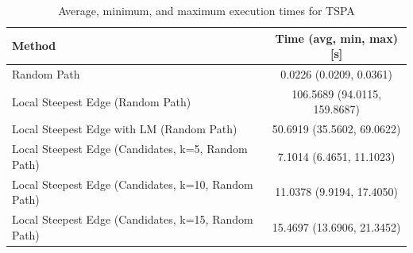 \begin{table}[h!]
\centering
\begin{tabular}{lc}
\hline
Method & Time (avg, min, max) [s] \\
\hline
Random Path & 0.0226 (0.0209, 0.0361) \\
Local Steepest Edge (Random Path) & 106.5689 (94.0115, 159.8687) \\
Local Steepest Edge with LM (Random Path) & 50.6919 (35.5602, 69.0622) \\
Local Steepest Edge (Candidates, k=5, Random Path) & 7.1014 (6.4651, 11.1023) \\
Local Steepest Edge (Candidates, k=10, Random Path) & 11.0378 (9.9194, 17.4050) \\
Local Steepest Edge (Candidates, k=15, Random Path) & 15.4697 (13.6906, 21.3452) \\
\hline
\end{tabular}
\caption{Average, minimum, and maximum execution times for TSPA}
\label{tab:TSPA_timings}
\end{table}
